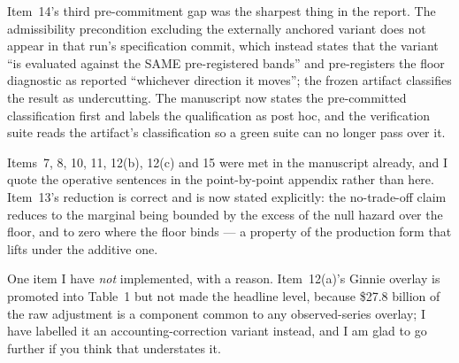 \documentclass[11pt]{article}
\begin{document}
Item~14's third pre-commitment gap was the sharpest thing in the report. The
admissibility precondition excluding the externally anchored variant does not
appear in that run's specification commit, which instead states that the variant
``is evaluated against the SAME pre-registered bands'' and pre-registers the floor
diagnostic as reported ``whichever direction it moves''; the frozen artifact
classifies the result as undercutting. The manuscript now states the
pre-committed classification first and labels the qualification as post hoc, and
the verification suite reads the artifact's classification so a green suite can no
longer pass over it.

Items~7, 8, 10, 11, 12(b), 12(c) and 15 were met in the manuscript already, and I
quote the operative sentences in the point-by-point appendix rather than here.
Item~13's reduction is correct and is now stated explicitly: the no-trade-off
claim reduces to the marginal being bounded by the excess of the null hazard over
the floor, and to zero where the floor binds --- a property of the production form
that lifts under the additive one.

One item I have \emph{not} implemented, with a reason. Item~12(a)'s Ginnie overlay
is promoted into Table~1 but not made the headline level, because \$27.8 billion of
the raw adjustment is a component common to any observed-series overlay; I have
labelled it an accounting-correction variant instead, and I am glad to go further if
you think that understates it.
\end{document}
